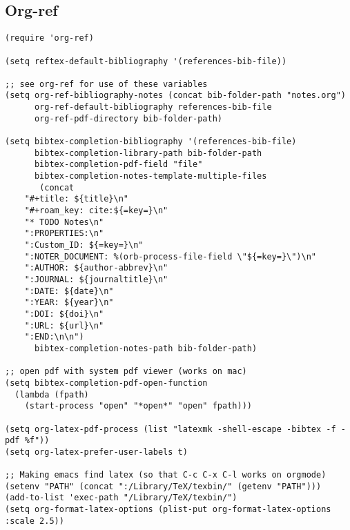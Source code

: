 \documentclass[11pt]{article}
\begin{document}
\subsection{Org-ref}
\label{sec:org246d2cd}
\begin{verbatim}
(require 'org-ref)

(setq reftex-default-bibliography '(references-bib-file))

;; see org-ref for use of these variables
(setq org-ref-bibliography-notes (concat bib-folder-path "notes.org")
      org-ref-default-bibliography references-bib-file
      org-ref-pdf-directory bib-folder-path)

(setq bibtex-completion-bibliography '(references-bib-file)
      bibtex-completion-library-path bib-folder-path
      bibtex-completion-pdf-field "file"
      bibtex-completion-notes-template-multiple-files
       (concat
	"#+title: ${title}\n"
	"#+roam_key: cite:${=key=}\n"
	"* TODO Notes\n"
	":PROPERTIES:\n"
	":Custom_ID: ${=key=}\n"
	":NOTER_DOCUMENT: %(orb-process-file-field \"${=key=}\")\n"
	":AUTHOR: ${author-abbrev}\n"
	":JOURNAL: ${journaltitle}\n"
	":DATE: ${date}\n"
	":YEAR: ${year}\n"
	":DOI: ${doi}\n"
	":URL: ${url}\n"
	":END:\n\n")
      bibtex-completion-notes-path bib-folder-path)

;; open pdf with system pdf viewer (works on mac)
(setq bibtex-completion-pdf-open-function
  (lambda (fpath)
    (start-process "open" "*open*" "open" fpath)))

(setq org-latex-pdf-process (list "latexmk -shell-escape -bibtex -f -pdf %f"))
(setq org-latex-prefer-user-labels t)

;; Making emacs find latex (so that C-c C-x C-l works on orgmode)
(setenv "PATH" (concat ":/Library/TeX/texbin/" (getenv "PATH")))
(add-to-list 'exec-path "/Library/TeX/texbin/")
(setq org-format-latex-options (plist-put org-format-latex-options :scale 2.5))

\end{verbatim}
\end{document}
